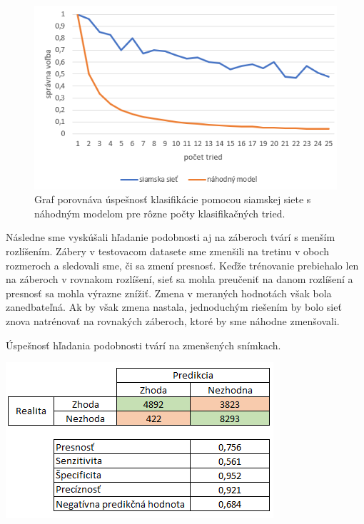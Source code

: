 \begin{figure}[H]
\centerline{\includegraphics[width=1\textwidth]{images/graph_oneshot_face.png}}
\caption[Výsledky klasifikácie podľa tváre]{Graf porovnáva úspešnosť klasifikácie pomocou siamskej siete s náhodným modelom pre rôzne počty klasifikačných tried.}
\label{obr:graph_oneshot_face}
\end{figure}


Následne sme vyskúšali hľadanie podobnosti aj na záberoch tvárí s menším rozlíšením.
Zábery v testovacom datasete sme zmenšili na tretinu v oboch rozmeroch a sledovali sme, či sa zmení presnosť.
Keďže trénovanie prebiehalo len na záberoch v rovnakom rozlíšení, sieť sa mohla preučeniť na danom rozlíšení a presnosť sa mohla výrazne znížiť.
Zmena v meraných hodnotách však bola zanedbateľná.
Ak by však zmena nastala, jednoduchým riešením by bolo sieť znova natrénovať na rovnakých záberoch, ktoré by sme náhodne zmenšovali.



\begin{table}[H]
  \caption[Úspešnosť hľadania podobnosti tvárí na zmenšených snímkach]{Úspešnosť hľadania podobnosti tvárí na zmenšených snímkach.}
  \label{tbl:face1_table}
  \begin{center}
  \includegraphics{images/face2_table}
  \end{center}
\end{table}

